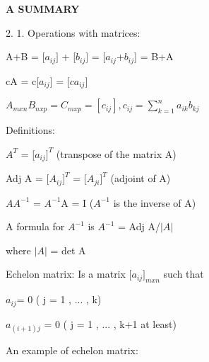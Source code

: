\documentclass[11pt]{amsbook}
\begin{document}



\begin{center}
\textbf{A SUMMARY}
\end{center}


\bigskip

\bigskip

2. 1.  Operations with matrices:

\hspace{20mm}  A+B  = [$a_{ij}]$ + [$b_{ij}]$ = [$a_{ij}$+$b_{ij}$] = B+A

\hspace{20mm}  cA =  c[$a_{ij}]$ =  [$ca_{ij}]$

\hspace{20mm} $A_{mxn} B_{nxp} = C_{mxp} = [c_{ij}] , c_{ij} = \sum_{k=1}^{n} a_{ik} b_{kj}  $

\bigskip

\hspace{10mm} Definitions:

\hspace{20mm} $A^T$ = [$a_{ij}]^T$  (transpose of the matrix A)

\hspace{20mm} Adj A = [$A_{ij}]^T$ = [$A_{ji}]^T$ (adjoint of A)

\hspace{20mm} $AA^{-1}$ = $A^{-1}$A = I ($A^{-1}$ is the inverse of A)

\hspace{25mm} A formula for $A^{-1}$ is $A^{-1}$ = Adj A/$\mathopen|A\mathclose|$

\hspace{25mm} where $\mathopen|A\mathclose|$ = det A

\bigskip

\hspace{10mm} Echelon matrix: Is a matrix [$a_{ij}]_{mxn}$ such that

\hspace{25mm} $a_{ij}$= 0 ( j = 1 , ... , k)

\hspace{25mm} $a_{(i+1)j}$ = 0 ( j = 1 , ... , k+1 at least)

\bigskip

\hspace{10mm} An example of echelon matrix:
\end{document}
